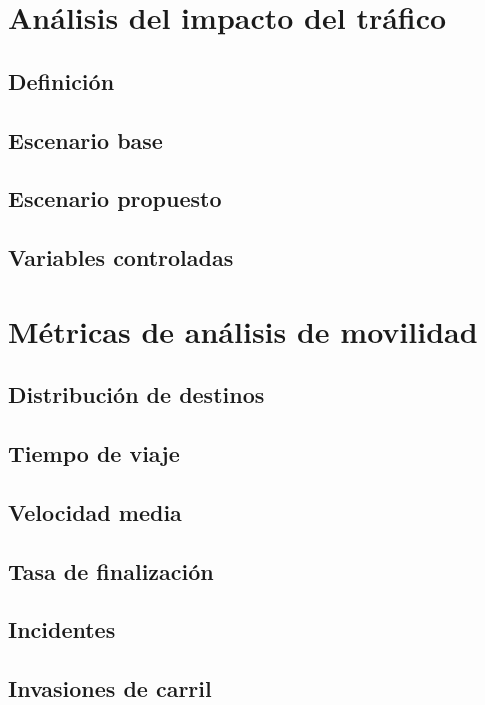\section{Análisis del impacto del tráfico}

\subsection{Definición}

\subsection{Escenario base}

\subsection{Escenario propuesto}

\subsection{Variables controladas}

\section{Métricas de análisis de movilidad}

\subsection{Distribución de destinos}

\subsection{Tiempo de viaje}

\subsection{Velocidad media}

\subsection{Tasa de finalización}

\subsection{Incidentes}

\subsection{Invasiones de carril}

